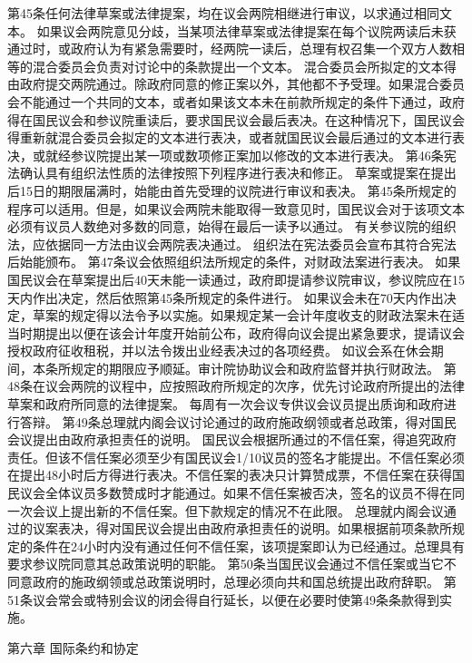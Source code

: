     第45条任何法律草案或法律提案，均在议会两院相继进行审议，以求通过相同文本。
    如果议会两院意见分歧，当某项法律草案或法律提案在每个议院两读后未获通过时，或政府认为有紧急需要时，经两院一读后，总理有权召集一个双方人数相等的混合委员会负责对讨论中的条款提出一个文本。
    混合委员会所拟定的文本得由政府提交两院通过。除政府同意的修正案以外，其他都不予受理。如果混合委员会不能通过一个共同的文本，或者如果该文本未在前款所规定的条件下通过，政府得在国民议会和参议院重读后，要求国民议会最后表决。在这种情况下，国民议会得重新就混合委员会拟定的文本进行表决，或者就国民议会最后通过的文本进行表决，或就经参议院提出某一项或数项修正案加以修改的文本进行表决。
    第46条宪法确认具有组织法性质的法律按照下列程序进行表决和修正。
    草案或提案在提出后15日的期限届满时，始能由首先受理的议院进行审议和表决。
    第45条所规定的程序可以适用。但是，如果议会两院未能取得一致意见时，国民议会对于该项文本必须有议员人数绝对多数的同意，始得在最后一读予以通过。
    有关参议院的组织法，应依据同一方法由议会两院表决通过。
    组织法在宪法委员会宣布其符合宪法后始能颁布。
    第47条议会依照组织法所规定的条件，对财政法案进行表决。
    如果国民议会在草案提出后40天未能一读通过，政府即提请参议院审议，参议院应在15天内作出决定，然后依照第45条所规定的条件进行。
    如果议会未在70天内作出决定，草案的规定得以法令予以实施。如果规定某一会计年度收支的财政法案未在适当时期提出以便在该会计年度开始前公布，政府得向议会提出紧急要求，提请议会授权政府征收租税，并以法令拨出业经表决过的各项经费。
    如议会系在休会期间，本条所规定的期限应予顺延。审计院协助议会和政府监督并执行财政法。
    第48条在议会两院的议程中，应按照政府所规定的次序，优先讨论政府所提出的法律草案和政府所同意的法律提案。
    每周有一次会议专供议会议员提出质询和政府进行答辩。
    第49条总理就内阁会议讨论通过的政府施政纲领或者总政策，得对国民会议提出由政府承担责任的说明。
    国民议会根据所通过的不信任案，得追究政府责任。但该不信任案必须至少有国民议会1/10议员的签名才能提出。不信任案必须在提出48小时后方得进行表决。不信任案的表决只计算赞成票，不信任案在获得国民议会全体议员多数赞成时才能通过。如果不信任案被否决，签名的议员不得在同一次会议上提出新的不信任案。但下款规定的情况不在此限。
    总理就内阁会议通过的议案表决，得对国民议会提出由政府承担责任的说明。如果根据前项条款所规定的条件在24小时内没有通过任何不信任案，该项提案即认为已经通过。总理具有要求参议院同意其总政策说明的职能。
    第50条当国民议会通过不信任案或当它不同意政府的施政纲领或总政策说明时，总理必须向共和国总统提出政府辞职。
    第51条议会常会或特别会议的闭会得自行延长，以便在必要时使第49条条款得到实施。
                    
                       第六章    国际条约和协定
 
